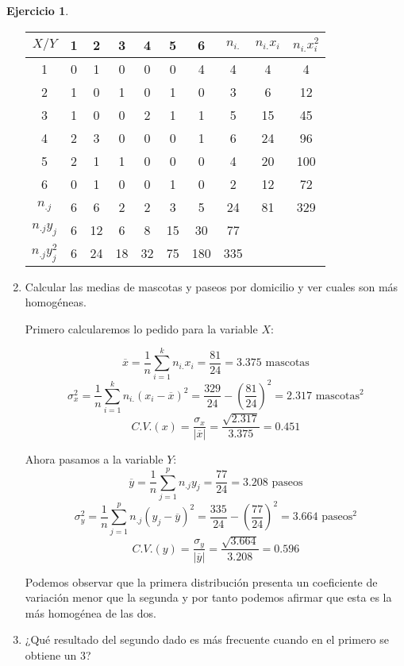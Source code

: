 \documentclass[a4paper, 12pt]{article}
\providecommand{\abs}[1]{\lvert#1\rvert}
\theoremstyle{definition}
\newtheorem{ej}{Ejercicio}
\begin{document}
\begin{ej}
\begin{enumerate}[label=\alph*)]
	\begin{center}
	\begin{tabular}{c|c c c c c c|c c c}
	\(X/Y\) & 1 & 2 & 3 & 4 & 5 & 6 & \(n_{i.}\) & \(n_{i.} x_i\) & \(n_{i.}x_i^2\) \\
	\hline
	1 & 0 & 1 & 0 & 0 & 0 & 4 & 4 & 4 & 4 \\
	2 & 1 & 0 & 1 & 0 & 1 & 0 & 3 & 6 & 12 \\
	3 & 1 & 0 & 0 & 2 & 1 & 1 & 5 & 15 & 45\\
	4 & 2 & 3 & 0 & 0 & 0 & 1 & 6 & 24 & 96 \\
	5 & 2 & 1 & 1 & 0 & 0 & 0 & 4 & 20 & 100 \\
	6 & 0 & 1 & 0 & 0 & 1 & 0 & 2 & 12 & 72\\
	\hline 
	\(n_{.j}\) & 6 & 6 & 2 & 2 & 3 & 5 & 24 & 81 & 329 \\
	\(n_{.j} y_j\) & 6 & 12 & 6 & 8 & 15 & 30 & 77 & & \\
	\(n_{.j}y_j^2\) & 6 & 24 & 18 & 32 & 75 & 180 & 335 & & \\
	\end{tabular}
	\end{center}
	
	\item Calcular las medias de mascotas y paseos por domicilio y ver cuales son más homogéneas.
	
	Primero calcularemos lo pedido para la variable \(X\):
	
\[
	\overline{x} = \frac{1}{n} \sum_{i=1}^{k} n_{i.}x_i = \frac{81}{24} = 3.375 \text{ mascotas}
\]
\[
	\sigma_x^2 = \frac{1}{n} \sum_{i=1}^{k} n_{i.} (x_i - \overline{x})^2 = \frac{329}{24} - \left(\frac{81}{24}\right)^2 = 2.317 \text{ mascotas}^2
\]
\[
	C.V.(x) = \frac{\sigma_x}{\abs{\overline{x}}} = \frac{\sqrt{2.317}}{3.375} = 0.451
\]

Ahora pasamos a la variable \(Y\):
\[
	\overline{y} = \frac{1}{n} \sum_{j=1}^{p} n_{.j} y_j = \frac{77}{24} = 3.208 \text{ paseos}
\]
\[
	\sigma_y^2 = \frac{1}{n} \sum_{j=1}^{p} n_{.j}(y_j - \overline{y})^2 = \frac{335}{24} - \left( \frac{77}{24} \right)^2 = 3.664 \text{ paseos}^2
\]
\[
	C.V.(y) = \frac{\sigma_y}{\abs{\overline{y}}} = \frac{\sqrt{3.664}}{3.208} = 0.596
\]

Podemos observar que la primera distribución presenta un coeficiente de variación menor que la segunda y por tanto podemos afirmar que esta es la más homogénea de las dos.

	\item ¿Qué resultado del segundo dado es más frecuente cuando en el primero se obtiene un 3?
	

\end{enumerate}
\end{ej}
\end{document}
